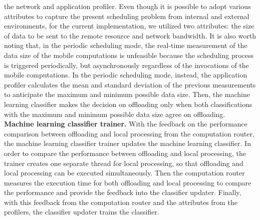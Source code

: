\documentclass[10pt, conference, compsocconf]{IEEEtran}
\begin{document}
{the network and application profiler.
%
Even though it is possible to adopt various attributes to capture the
present scheduling problem from internal and external environments, for
the current implementation, we utilized two attributes: the size of data
to be sent to the remote resource and network bandwidth.
%
It is also worth noting that, in the periodic scheduling mode, the
real-time measurement of the data size of the mobile computations is
unfeasible because the scheduling process is triggered periodically, but
asynchronously regardless of the invocations of the mobile computations.
%
In the periodic scheduling mode, instead, the application profiler
calculates the mean and standard deviation of the previous measurements
to anticipate the maximum and minimum possible data size.
%
Then, the machine learning classifier makes the decision on offloading
only when both classifications with the maximum and minimum possible
data size agree on offloading.\\
%
\textbf{Machine learning classifier trainer.} With the feedback on the
performance comparison between offloading and local processing from the
computation router, the machine learning classifier trainer updates
the machine learning classifier.
%
In order to compare the performance between offloading and local
processing, the trainer creates one separate thread for local
processing, so that offloading and local processing can be executed
simultaneously.
%
Then the computation router measures the execution time for both
offloading and local processing to compare the performance and provide
the feedback into the classifier updater.
%
Finally, with this feedback from the computation router and the
attributes from the profilers, the classifier updater trains the
classifier.
%
}
\end{document}
